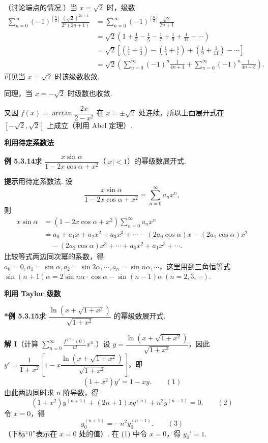 \documentclass[UTF8,12pt,a4paper,fontset=fandol]{ctexart}
\begin{document}
（讨论端点的情况.）当 $x=\sqrt2$ 时，级数
\[
\begin{aligned}
\sum_{n=0}^{\infty}(-1)^{\left[\frac n2\right]}
\frac{(\sqrt2)^{2n+1}}{2^n(2n+1)}
&=\sum_{n=0}^{\infty}(-1)^{\left[\frac n2\right]}\frac{\sqrt2}{2n+1}\\
&=\sqrt2\left(1+\frac13-\frac15-\frac17+\frac19+\frac1{11}-\cdots\right)\\
&=\sqrt2\left[\left(\frac11+\frac13\right)-\left(\frac15+\frac17\right)
+\left(\frac19+\frac1{11}\right)-\cdots\right]\\
&=\sqrt2\left(\sum_{n=0}^{\infty}(-1)^n\frac1{4n+1}
+\sum_{n=0}^{\infty}(-1)^n\frac1{4n+3}\right).
\end{aligned}
\]
可见当 $x=\sqrt2$ 时该级数收敛.

同理，当 $x=-\sqrt2$ 时级数也收敛.

又因 $f(x)=\arctan\dfrac{2x}{2-x^2}$ 在 $x=\pm\sqrt2$ 处连续，所以上面展开式在
$[-\sqrt2,\sqrt2]$ 上成立（利用 Abel 定理）.

\noindent\textbf{利用待定系数法}

\noindent\textbf{例 5.3.14}\quad 求 $\dfrac{x\sin\alpha}{1-2x\cos\alpha+x^2}$（$|x|<1$）的幂级数展开式.

\noindent\textbf{提示}\quad 用待定系数法. 设
\[
  \frac{x\sin\alpha}{1-2x\cos\alpha+x^2}
  =\sum_{n=0}^{\infty}a_nx^n,
\]
则
\[
\begin{aligned}
x\sin\alpha
&=(1-2x\cos\alpha+x^2)\sum_{n=0}^{\infty}a_nx^n\\
&=a_0+a_1x+a_2x^2+a_3x^3+\cdots
-(2a_0\cos\alpha)x-(2a_1\cos\alpha)x^2\\
&\quad-(2a_2\cos\alpha)x^3+\cdots+a_0x^2+a_1x^3+\cdots.
\end{aligned}
\]
比较等式两边同次幂的系数，得 $a_0=0,a_1=\sin\alpha,a_2=\sin2\alpha,\cdots,a_n=\sin n\alpha,\cdots$，这里用到三角恒等式
$\sin(n+1)\alpha=2\sin n\alpha\cdot\cos\alpha-\sin(n-1)\alpha\ (n=2,3,\cdots)$.

\noindent\textbf{利用 Taylor 级数}

\noindent\textbf{*例 5.3.15}\quad 求 $\dfrac{\ln(x+\sqrt{1+x^2})}{\sqrt{1+x^2}}$ 的幂级数展开式.

\noindent\textbf{解 I}\quad （计算 $\displaystyle\sum_{n=0}^{\infty}\frac{f^{(n)}(0)}{n!}x^n$.）设
$y=\dfrac{\ln(x+\sqrt{1+x^2})}{\sqrt{1+x^2}}$，因此
$y'=\dfrac1{1+x^2}\left[1-x\dfrac{\ln(x+\sqrt{1+x^2})}{\sqrt{1+x^2}}\right]$，即
\[
  (1+x^2)y'=1-xy. \qquad(1)
\]
由此两边同时求 $n$ 阶导数，得
\[
  (1+x^2)y^{(n+1)}+(2n+1)xy^{(n)}+n^2y^{(n-1)}=0. \qquad(2)
\]
令 $x=0$，得
\[
  y_0^{(n+1)}=-n^2y_0^{(n-1)}. \qquad(3)
\]
（下标“0”表示在 $x=0$ 处的值）. 在 (1) 中令 $x=0$，得 $y_0'=1$.
\end{document}
